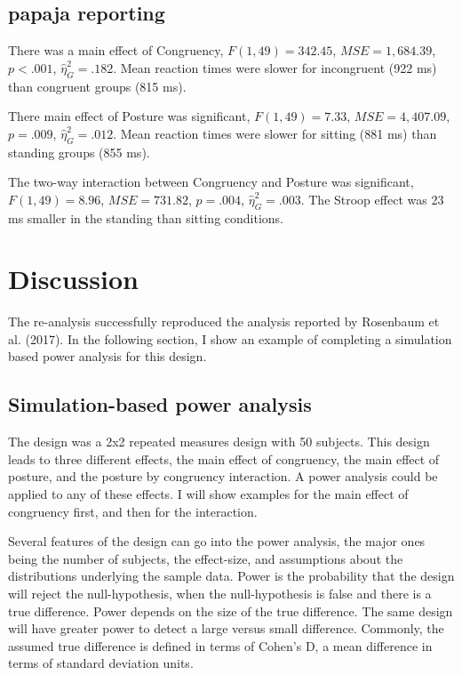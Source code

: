 \documentclass[
  english,
  man]{apa6}
\begin{document}
\hypertarget{papaja-reporting}{%
\subsection{papaja reporting}\label{papaja-reporting}}

There was a main effect of Congruency, \(F(1, 49) = 342.45\), \(\mathit{MSE} = 1,684.39\), \(p < .001\), \(\hat{\eta}^2_G = .182\). Mean reaction times were slower for incongruent (922 ms) than congruent groups (815 ms).

There main effect of Posture was significant, \(F(1, 49) = 7.33\), \(\mathit{MSE} = 4,407.09\), \(p = .009\), \(\hat{\eta}^2_G = .012\). Mean reaction times were slower for sitting (881 ms) than standing groups (855 ms).

The two-way interaction between Congruency and Posture was significant, \(F(1, 49) = 8.96\), \(\mathit{MSE} = 731.82\), \(p = .004\), \(\hat{\eta}^2_G = .003\). The Stroop effect was 23 ms smaller in the standing than sitting conditions.

\hypertarget{discussion}{%
\section{Discussion}\label{discussion}}

The re-analysis successfully reproduced the analysis reported by Rosenbaum et al. (2017). In the following section, I show an example of completing a simulation based power analysis for this design.

\hypertarget{simulation-based-power-analysis}{%
\subsection{Simulation-based power analysis}\label{simulation-based-power-analysis}}

The design was a 2x2 repeated measures design with 50 subjects. This design leads to three different effects, the main effect of congruency, the main effect of posture, and the posture by congruency interaction. A power analysis could be applied to any of these effects. I will show examples for the main effect of congruency first, and then for the interaction.

Several features of the design can go into the power analysis, the major ones being the number of subjects, the effect-size, and assumptions about the distributions underlying the sample data. Power is the probability that the design will reject the null-hypothesis, when the null-hypothesis is false and there is a true difference. Power depends on the size of the true difference. The same design will have greater power to detect a large versus small difference. Commonly, the assumed true difference is defined in terms of Cohen's D, a mean difference in terms of standard deviation units.
\end{document}
